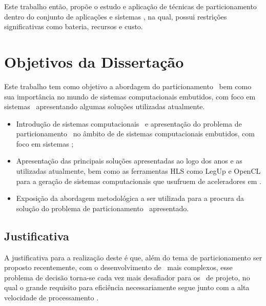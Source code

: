 
   
   Este trabalho então, propõe o estudo e aplicação de técnicas de particionamento dentro do conjunto de aplicações e sistemas \wearable, na qual, possui restrições significativas como bateria, recursos e custo.

\section{Objetivos da Dissertação}
	Este trabalho tem como objetivo a abordagem do particionamento \hs\ bem como sua importância no mundo de sistemas computacionais embutidos, com foco em sistemas \wearables\ apresentando algumas soluções utilizadas atualmente.

    \begin{itemize}
      
         \item Introdução de sistemas computacionais \wearables\ e apresentação do problema de particionamento \hs\ no âmbito de de sistemas computacionais embutidos, com foco em sistemas \wearables;
         
         \item Apresentação das principais soluções apresentadas ao logo dos anos e as utilizadas atualmente, bem como as ferramentas HLS como LegUp e OpenCL para a geração de sistemas computacionais que usufruem de aceleradores em \hardware.
         
         \item Exposição da abordagem metodológica a ser utilizada para a procura da solução do problema de particionamento \hs\ apresentado.
    \end{itemize}

   \subsection{Justificativa}

	A justificativa para a realização deste é que, além do tema de particionamento ser proposto recentemente, com o desenvolvimento de \designs\ mais complexos, esse problema de decisão torna-se cada vez mais desafiador para os \designers\ de projeto, no qual o grande requisito para eficiência necessariamente segue junto com a alta velocidade de processamento \citep{Trindade2016, Arato2005, Yan2017}.
	
